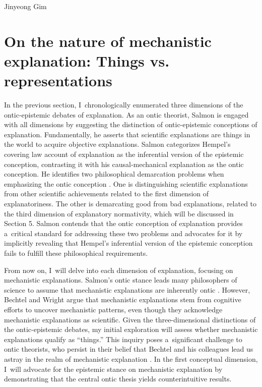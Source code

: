 \begin{artengenv}{Jinyeong Gim}
\section{On the nature of mechanistic explanation: Things vs. representations}
In the previous section, I~chronologically enumerated three dimensions of the ontic-epistemic debates of explanation. As an ontic theorist, Salmon is engaged with all dimensions by suggesting the distinction of ontic-epistemic conceptions of explanation. Fundamentally, he asserts that scientific explanations are things in the world to acquire objective explanations. Salmon categorizes Hempel's covering law account of explanation as the inferential version of the epistemic conception, contrasting it with his causal-mechanical explanation as the ontic conception. He identifies two philosophical demarcation problems when emphasizing the ontic conception
\parencite[see][]{salmon_scientific_1984}. %
 One is distinguishing scientific explanations from other scientific achievements related to the first dimension of explanatoriness. The other is demarcating good from bad explanations, related to the third dimension of explanatory normativity, which will be discussed in Section 5. Salmon contends that the ontic conception of explanation provides a~critical standard for addressing these two problems and advocates for it by implicitly revealing that Hempel's inferential version of the epistemic conception fails to fulfill these philosophical requirements.

From now on, I~will delve into each dimension of explanation, focusing on mechanistic explanations. Salmon's ontic stance leads many philosophers of science to assume that mechanistic explanations are inherently ontic
\parencites[see][]{craver_explaining_2007}[][]{kaplan_explanatory_2011}[][]{povich_minimal_2018}. %
 However, Bechtel and Wright argue that mechanistic explanations stem from cognitive efforts to uncover mechanistic patterns, even though they acknowledge mechanistic explanations as scientific. Given the three-dimensional distinctions of the ontic-epistemic debates, my initial exploration will assess whether mechanistic explanations qualify as ``things.'' This inquiry poses a~significant challenge to ontic theorists, who persist in their belief that Bechtel and his colleagues lead us astray in the realm of mechanistic explanation 
\parencite[see][]{kaiser_ontic_2014}. %
 In the first conceptual dimension, I~will advocate for the epistemic stance on mechanistic explanation by demonstrating that the central ontic thesis yields counterintuitive results.


\end{artengenv}

